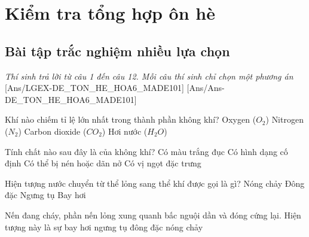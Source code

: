 \documentclass[FileMain.tex]{subfiles}
\gdef\made{101}
\begin{document}
\section[Kiểm tra tổng hợp ôn hè Khoa học tự nhiên 6 - Mã đề \made]{Kiểm tra tổng hợp ôn hè}

\subsection{Bài tập trắc nghiệm nhiều lựa chọn}\textit{\large Thí sinh trả lời từ câu 1 đến câu 12. Mỗi câu thí sinh chỉ chọn một phương án}
[Ans/LGEX-DE_TON_HE_HOA6_MADE101]
[Ans/Ans-DE_TON_HE_HOA6_MADE101]

\begin{ex}%
Khí nào chiếm tỉ lệ lớn nhất trong thành phần không khí?
\choice
{Oxygen ($O_2$)}
{\True Nitrogen ($N_2$)}
{Carbon dioxide ($CO_2$)}
{Hơi nước ($H_2O$)}
\end{ex}

\begin{ex}%
Tính chất nào sau đây là của không khí?
\choice
{Có màu trắng đục}
{Có hình dạng cố định}
{\True Có thể bị nén hoặc dãn nở}
{Có vị ngọt đặc trưng}
\end{ex}

\begin{ex}%
Hiện tượng nước chuyển từ thể lỏng sang thể khí được gọi là gì?
\choice
{Nóng chảy}
{Đông đặc}
{Ngưng tụ}
{\True Bay hơi}
\end{ex}

\begin{ex}%
Nến đang cháy, phần nến lỏng xung quanh bấc nguội dần và đóng cứng lại. Hiện tượng này là sự
\choice
{bay hơi}
{ngưng tụ}
{\True đông đặc}
{nóng chảy}
\end{ex}
\end{document}
